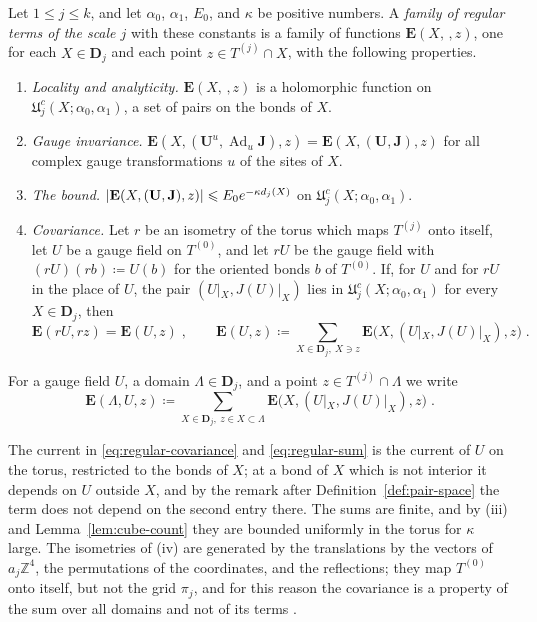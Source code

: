 \documentclass[11pt]{preprint}
\makeatletter
\newcommand{\Ad}{\operatorname{Ad}}
\DeclarePairedDelimiter{\abs}{\lvert}{\rvert}
\newcommand*{\bigcdot}{}%
\DeclareRobustCommand*{\bigcdot}{%
	\mathbin{\mathpalette\bigcdot@{}}%
}
\newcommand*{\bigcdot@scalefactor}{.7}
\newcommand*{\bigcdot@widthfactor}{1.15}
\newcommand*{\bigcdot@}[2]{%
	\sbox0{$#1\vcenter{}$}%
	\sbox2{$#1\cdot\m@th$}%
	\hbox to \bigcdot@widthfactor\wd2{%
		\hss
		\raise\ht0\hbox{%
			\scalebox{\bigcdot@scalefactor}{%
				\lower\ht0\hbox{$#1\bullet\m@th$}%
			}%
		}%
		\hss
	}%
}
\numberwithin{equation}{section}
\makeatother
\begin{document}
\begin{definition}\label{def:regular-terms}
Let $1 \leqslant j \leqslant k$, and let $\alpha_0$, $\alpha_1$, $E_0$, and $\kappa$ be positive numbers. A \emph{family of regular terms of the scale $j$} with these constants is a family of functions $\mathbf E(X, \bigcdot\,, z)$, one for each $X \in \mathbf D_j$ and each point $z \in T^{(j)} \cap X$, with the following properties.
\begin{enumerate}[label=(\roman*)]
\item \emph{Locality and analyticity.} $\mathbf E(X, \bigcdot\,, z)$ is a holomorphic function on $\mathfrak U^c_j(X; \alpha_0, \alpha_1)$, a set of pairs on the bonds of $X$.
\item \emph{Gauge invariance.} $\mathbf E(X, (\mathbf U^u, \Ad_u\mathbf J), z) = \mathbf E(X, (\mathbf U, \mathbf J), z)$ for all complex gauge transformations $u$ of the sites of $X$.
\item \emph{The bound.} $\abs{\mathbf E(X, (\mathbf U, \mathbf J), z)} \leqslant E_0e^{-\kappa d_j(X)}$ on $\mathfrak U^c_j(X; \alpha_0, \alpha_1)$.
\item \emph{Covariance.} Let $r$ be an isometry of the torus which maps $T^{(j)}$ onto itself, let $U$ be a gauge field on $T^{(0)}$, and let $rU$ be the gauge field with $(rU)(rb) \coloneqq U(b)$ for the oriented bonds $b$ of $T^{(0)}$. If, for $U$ and for $rU$ in the place of $U$, the pair $(U|_X, J(U)|_X)$ lies in $\mathfrak U^c_j(X; \alpha_0, \alpha_1)$ for every $X \in \mathbf D_j$, then
\begin{equation}\label{eq:regular-covariance}
    \mathbf E(rU, rz) = \mathbf E(U, z)\;,
    \qquad
    \mathbf E(U, z) \coloneqq \sum_{X \in \mathbf D_j,\ X \ni z}\mathbf E\bigl(X, (U|_X, J(U)|_X), z\bigr)\;.
\end{equation}
\end{enumerate}
For a gauge field $U$, a domain $\Lambda \in \mathbf D_j$, and a point $z \in T^{(j)} \cap \Lambda$ we write
\begin{equation}\label{eq:regular-sum}
    \mathbf E(\Lambda, U, z) \coloneqq \sum_{X \in \mathbf D_j,\ z \in X \subset \Lambda}\mathbf E\bigl(X, (U|_X, J(U)|_X), z\bigr)\;.
\end{equation}
\end{definition}

The current in \eqref{eq:regular-covariance} and \eqref{eq:regular-sum} is the current of $U$ on the torus, restricted to the bonds of $X$; at a bond of $X$ which is not interior it depends on $U$ outside $X$, and by the remark after Definition~\ref{def:pair-space} the term does not depend on the second entry there. The sums are finite, and by (iii) and Lemma~\ref{lem:cube-count} they are bounded uniformly in the torus for $\kappa$ large. The isometries of (iv) are generated by the translations by the vectors of $a_j\mathbb Z^4$, the permutations of the coordinates, and the reflections; they map $T^{(0)}$ onto itself, but not the grid $\pi_j$, and for this reason the covariance is a property of the sum over all domains and not of its terms \cite[(2.29), p.~260]{BalabanCRE}.
\end{document}
